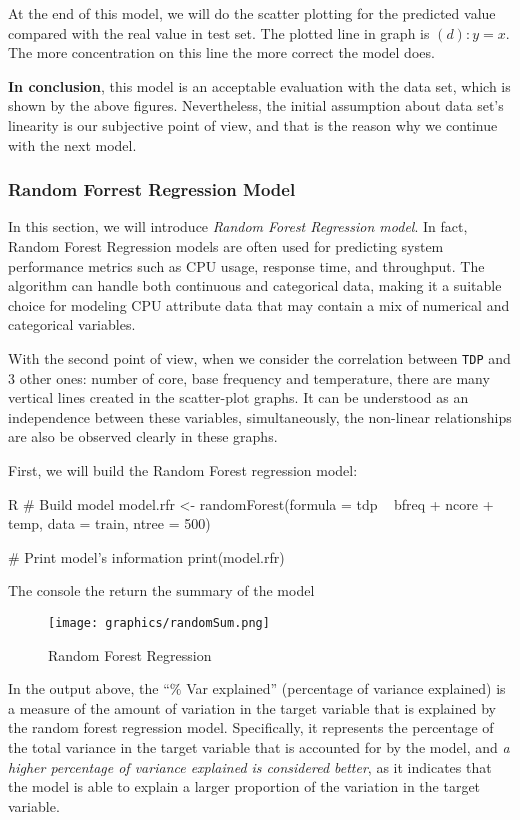 At the end of this model, we will do the scatter plotting for the predicted value compared with the real value in test set. The plotted line in graph is $(d): y = x$. The more concentration on this line the more correct the model does.

\textbf{In conclusion}, this model is an acceptable evaluation with the data set, which is shown by the above figures. Nevertheless, the initial assumption about data set's linearity is our subjective point of view, and that is the reason why we continue with the next model.


\subsubsection{Random Forrest Regression Model}
\label{section:data_analysis_randomforrest}
In this section, we will introduce \emph{Random Forest Regression model}. In fact, Random Forest Regression models are often used for predicting system performance metrics such as CPU usage, response time, and throughput. The algorithm can handle both continuous and categorical data, making it a suitable choice for modeling CPU attribute data that may contain a mix of numerical and categorical variables.

With the second point of view, when we consider the correlation between \verb|TDP| and 3 other ones: number of core, base frequency and temperature, there are many vertical lines created in the scatter-plot graphs. It can be understood as an independence between these variables, simultaneously, the non-linear relationships are also be observed clearly in these graphs.

First, we will build the Random Forest regression model:
\begin{code}{R}
# Build model
model.rfr <- randomForest(formula = tdp ~ bfreq + ncore + temp, data = train, ntree = 500)

# Print model's information
print(model.rfr)
\end{code}

The console the return the summary of the model
\begin{figure}[H]
    \centering
    \texttt{[image: graphics/randomSum.png]}
    \caption{Random Forest Regression}
    \label{fig:randomForest}
\end{figure}

In the output above, the “$\%$ Var explained” (percentage of variance explained) is a measure of the amount of variation in the target variable that is explained by the random forest regression model. Specifically, it represents the percentage of the total variance in the target variable that is accounted for by the model, and \textit{a higher percentage of variance explained is considered better}, as it indicates that the model is able to explain a larger proportion of the variation in the target variable.

